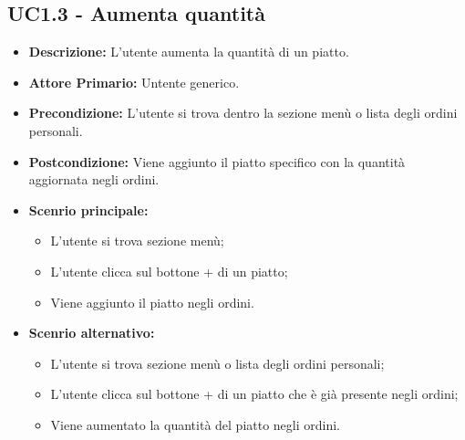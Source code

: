\subsection{UC1.3 - Aumenta quantità}
\begin{itemize}
    \item \textbf{Descrizione:} L'utente aumenta la quantità di un piatto.
    \item \textbf{Attore Primario:} Untente generico.
    \item \textbf{Precondizione:} L'utente si trova dentro la sezione menù o lista degli ordini personali.
    \item \textbf{Postcondizione:} Viene aggiunto il piatto specifico con la quantità aggiornata negli ordini.
    \item \textbf{Scenrio principale:}
    \begin{itemize}
        \item L'utente si trova sezione menù;
        \item L'utente clicca sul bottone + di un piatto;
        \item Viene aggiunto il piatto negli ordini.
    \end{itemize}
    \item \textbf{Scenrio alternativo:}
    \begin{itemize}
        \item L'utente si trova sezione menù o lista degli ordini personali;
        \item L'utente clicca sul bottone + di un piatto che è già presente negli ordini;
        \item Viene aumentato la quantità del piatto negli ordini.
    \end{itemize}
\end{itemize}
